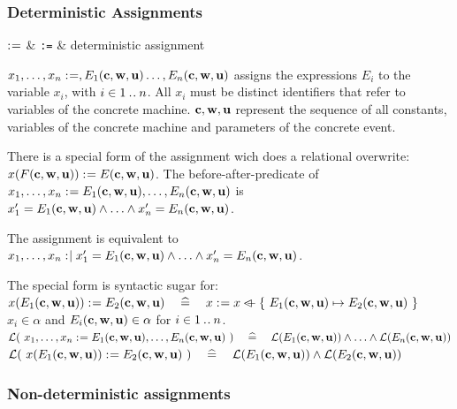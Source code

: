 \subsubsection{Deterministic Assignments}
\label{deterministic_assignments}
\begin{rrnames}
  $\mathrel{:\mkern1mu=}$ & \texttt{:=} & deterministic assignment
\end{rrnames}
\begin{rodinrefentry}
  \rrdesc
    $x_1,\ldots,x_n \mathrel{:\mkern1mu=} ,E_{1}(\mathbf{c},\mathbf{w},\mathbf{u})\ldots,E_{n}(\mathbf{c},\mathbf{w},\mathbf{u})$
    assigns the expressions $E_i$ to the variable $x_i$, with $i\in1\mathbin{.\mkern1mu.} n$.
    All $x_i$ must be distinct identifiers that refer to variables of the concrete machine.
    $\mathbf{c},\mathbf{w},\mathbf{u}$ represent the sequence of all constants, 
    variables of the concrete machine and parameters of the concrete event.

    There is a special form of the assignment wich does a relational overwrite:\\
    $x(F(\mathbf{c},\mathbf{w},\mathbf{u})) \mathrel{:\mkern1mu=} E(\mathbf{c},\mathbf{w},\mathbf{u})$.
  \rrdef
    The before-after-predicate of $x_1,\ldots,x_n \mathrel{:\mkern1mu=} E_{1}(\mathbf{c},\mathbf{w},\mathbf{u}),\ldots,E_{n}(\mathbf{c},\mathbf{w},\mathbf{u})$ is\\ $x_1' = E_{1}(\mathbf{c},\mathbf{w},\mathbf{u}) \land \ldots \land x_n' = E_{n}(\mathbf{c},\mathbf{w},\mathbf{u})$.

    The assignment is equivalent to
    $x_1,\ldots,x_n \mathrel{:\mkern1mu\mid} x_1' = E_{1}(\mathbf{c},\mathbf{w},\mathbf{u}) \land \ldots \land x_n' = E_{n}(\mathbf{c},\mathbf{w},\mathbf{u})$.

    The special form is syntactic sugar for:\\
    $x(E_{1}(\mathbf{c},\mathbf{w},\mathbf{u})) \mathrel{:\mkern1mu=} E_{2}(\mathbf{c},\mathbf{w},\mathbf{u})
      \quad\mathrel{\widehat=}\quad 
      x \mathrel{:\mkern1mu=} x \mathbin{\lhd\mkern-9mu-} \{~E_{1}(\mathbf{c},\mathbf{w},\mathbf{u}) \mapsto E_{2}(\mathbf{c},\mathbf{w},\mathbf{u})~\}$
  \rrtypes
    $x_i\in\alpha$ and  $E_{i}(\mathbf{c},\mathbf{w},\mathbf{u})\in\alpha$ for $i \in 1\mathbin{.\mkern1mu.} n$.
  \rrwd
    $\mathcal{L}(~x_1,\ldots,x_n \mathrel{:\mkern1mu=} E_{1}(\mathbf{c},\mathbf{w},\mathbf{u}),\ldots,E_{n}(\mathbf{c},\mathbf{w},\mathbf{u})~)
      \quad\mathrel{\widehat=}\quad 
      \mathcal{L}(E_{1}(\mathbf{c},\mathbf{w},\mathbf{u})) \land \ldots \land \mathcal{L}(E_{n}(\mathbf{c},\mathbf{w},\mathbf{u}))$ \\
    $\mathcal{L}(~x(E_{1}(\mathbf{c},\mathbf{w},\mathbf{u})) \mathrel{:\mkern1mu=} E_{2}(\mathbf{c},\mathbf{w},\mathbf{u})~)
    \quad\mathrel{\widehat=}\quad 
    \mathcal{L}(E_{1}(\mathbf{c},\mathbf{w},\mathbf{u})) \land \mathcal{L}(E_{2}(\mathbf{c},\mathbf{w},\mathbf{u}))$
\end{rodinrefentry}

\subsubsection{Non-deterministic assignments}
\label{nondeterministic_assignments}

